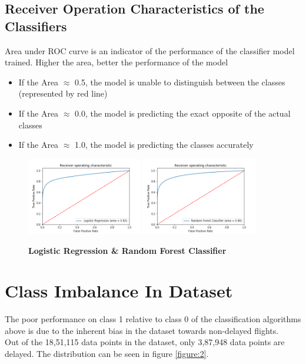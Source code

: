 \documentclass[12pt]{extarticle}
\begin{document}
\subsection*{Receiver Operation Characteristics of the Classifiers}
Area under ROC curve is an indicator of the performance of the classifier model trained. Higher the area, better the performance of the model
\begin{itemize}
    \item If the Area $\approx$ 0.5, the model is unable to distinguish between the classes (represented by red line)
    \item If the Area $\approx$ 0.0, the model is predicting the exact opposite of the actual classes
    \item If the Area $\approx$ 1.0, the model is predicting the classes accurately
\end{itemize}
\vfill
\begin{figure}[h]
    \centering
        \includegraphics[width=0.45\textwidth]{BeforeSMOTE/LogisticRegressorROC.png}
        \includegraphics[width=0.45\textwidth]{BeforeSMOTE/RandomForestClassifierROC.png}
    \label{figure:1}
    \caption{\textbf{Logistic Regression \& Random Forest Classifier}}
\end{figure}
\vfill
\newpage

\section{Class Imbalance In Dataset}
The poor performance on class 1 relative to class 0 of the classification algorithms above is due to the inherent bias in the dataset towards non-delayed flights.\\
Out of the 18,51,115 data points in the dataset, only 3,87,948 data points are delayed. The distribution can be seen in figure \ref{figure:2}.
\end{document}
